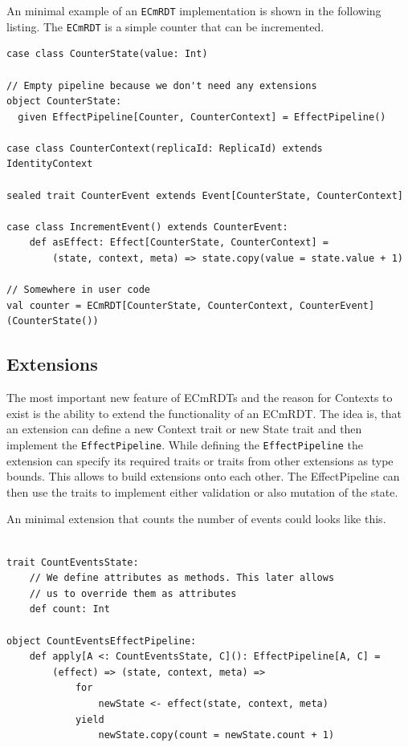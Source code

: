 \documentclass[
	ngerman,
	ruledheaders=section,   %
	class=report,		    %
	thesis={type=bachelor}, %
	accentcolor=9c,			%
	custommargins=false,    %
	marginpar=false,        %
	parskip=half-,          %
	fontsize=11pt,          %
]{tudapub}
\let\code\texttt
\begin{document}
An minimal example of an \code{ECmRDT} implementation is shown in the following listing. The \code{ECmRDT} is a simple counter that can be incremented.

\begin{lstlisting}
case class CounterState(value: Int)

// Empty pipeline because we don't need any extensions
object CounterState:
  given EffectPipeline[Counter, CounterContext] = EffectPipeline()

case class CounterContext(replicaId: ReplicaId) extends IdentityContext

sealed trait CounterEvent extends Event[CounterState, CounterContext]

case class IncrementEvent() extends CounterEvent:
	def asEffect: Effect[CounterState, CounterContext] =
		(state, context, meta) => state.copy(value = state.value + 1)

// Somewhere in user code
val counter = ECmRDT[CounterState, CounterContext, CounterEvent](CounterState())

\end{lstlisting}

\subsection{Extensions}

The most important new feature of ECmRDTs and the reason for Contexts to exist is the ability to extend the functionality of an ECmRDT. The idea is, that an extension can define a new Context trait or new State trait and then implement the \code{EffectPipeline}. While defining the \code{EffectPipeline} the extension can specify its required traits or traits from other extensions as type bounds. This allows to build extensions onto each other. The EffectPipeline can then use the traits to implement either validation or also mutation of the state.

An minimal extension that counts the number of events could looks like this.

\begin{lstlisting}

trait CountEventsState:
	// We define attributes as methods. This later allows
	// us to override them as attributes
	def count: Int

object CountEventsEffectPipeline:
	def apply[A <: CountEventsState, C](): EffectPipeline[A, C] =
		(effect) => (state, context, meta) =>
			for 
				newState <- effect(state, context, meta)
			yield
				newState.copy(count = newState.count + 1)

\end{lstlisting}
\end{document}
